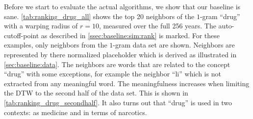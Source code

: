 Before we start to evaluate the actual algorithms, we show that our baseline is sane. \autoref{tab:ranking_drug_all} shows the top \num{20} neighbors of the $1$-gram \enquote{drug} with a warping radius of $r = 10$, measured over the full \num{256} years. The auto-cutoff-point as described in \autoref{ssec:baseline:sim:rank} is marked. For these examples, only neighbors from the $1$-gram data set are shown. Neighbors are represented by there normalized placeholder which is derived as illustrated in \autoref{sec:baseline:data}. The neighbors are words that are related to the concept \enquote{drug} with some exceptions, for example the neighbor \enquote{li} which is not extracted from any meaningful word. The meaningfulness increases when limiting the DTW to the second half of the data set. This is shown in \autoref{tab:ranking_drug_secondhalf}. It also turns out that \enquote{drug} is used in two contexts: as medicine and in terms of narcotics.

